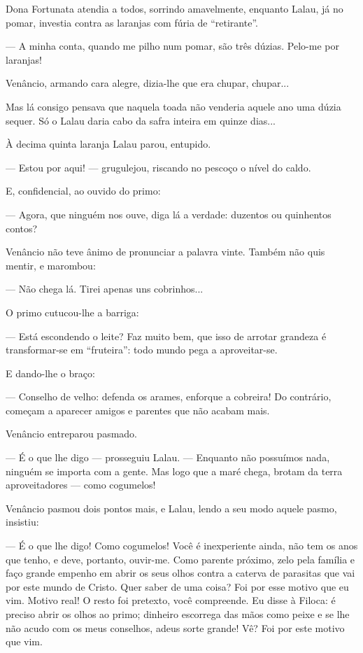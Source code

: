Dona Fortunata atendia a todos, sorrindo amavelmente, enquanto Lalau, já
no pomar, investia contra as laranjas com fúria de ``retirante''.

--- A minha conta, quando me pilho num pomar, são três dúzias. Pelo-me
por laranjas!

Venâncio, armando cara alegre, dizia-lhe que era chupar, chupar...

Mas lá consigo pensava que naquela toada não venderia aquele ano uma
dúzia sequer. Só o Lalau daria cabo da safra inteira em quinze dias...

À decima quinta laranja Lalau parou, entupido.

--- Estou por aqui! --- grugulejou, riscando no pescoço o nível do
caldo.

E, confidencial, ao ouvido do primo:

--- Agora, que ninguém nos ouve, diga lá a verdade: duzentos ou
quinhentos contos?

Venâncio não teve ânimo de pronunciar a palavra vinte. Também não quis
mentir, e marombou:

--- Não chega lá. Tirei apenas uns cobrinhos...

O primo cutucou-lhe a barriga:

--- Está escondendo o leite? Faz muito bem, que isso de arrotar grandeza
é transformar-se em ``fruteira'': todo mundo pega a aproveitar-se.

E dando-lhe o braço:

--- Conselho de velho: defenda os arames, enforque a cobreira! Do
contrário, começam a aparecer amigos e parentes que não acabam mais.

Venâncio entreparou pasmado.

--- É o que lhe digo --- prosseguiu Lalau. --- Enquanto não possuímos
nada, ninguém se importa com a gente. Mas logo que a maré chega, brotam
da terra aproveitadores --- como cogumelos!

Venâncio pasmou dois pontos mais, e Lalau, lendo a seu modo aquele
pasmo, insistiu:

--- É o que lhe digo! Como cogumelos! Você é inexperiente ainda, não tem
os anos que tenho, e deve, portanto, ouvir-me. Como parente próximo,
zelo pela família e faço grande empenho em abrir os seus olhos contra a
caterva de parasitas que vai por este mundo de Cristo. Quer saber de uma
coisa? Foi por esse motivo que eu vim. Motivo real! O resto foi
pretexto, você compreende. Eu disse à Filoca: é preciso abrir os olhos
ao primo; dinheiro escorrega das mãos como peixe e se lhe não acudo com
os meus conselhos, adeus sorte grande! Vê? Foi por este motivo que vim.

